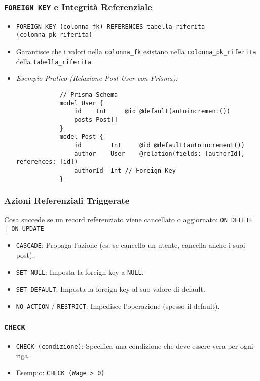 \documentclass{article}
\begin{document}
	\subsubsection{\texttt{FOREIGN KEY} e Integrità Referenziale}
	\begin{itemize}
		\item \texttt{FOREIGN KEY (colonna\_fk) REFERENCES tabella\_riferita (colonna\_pk\_riferita)}
		\item Garantisce che i valori nella \texttt{colonna\_fk} esistano nella \texttt{colonna\_pk\_riferita} della \texttt{tabella\_riferita}.
		\item \textit{Esempio Pratico (Relazione Post-User con Prisma):}
		\begin{verbatim}
			// Prisma Schema
			model User {
				id    Int     @id @default(autoincrement())
				posts Post[]
			}
			model Post {
				id        Int     @id @default(autoincrement())
				author    User    @relation(fields: [authorId], references: [id])
				authorId  Int // Foreign Key
			}
		\end{verbatim}
	\end{itemize}
	\subsubsection{Azioni Referenziali Triggerate}
	Cosa succede se un record referenziato viene cancellato o aggiornato: \texttt{ON DELETE | ON UPDATE}
	\begin{itemize}
		\item \texttt{CASCADE}: Propaga l'azione (es. se cancello un utente, cancella anche i suoi post).
		\item \texttt{SET NULL}: Imposta la foreign key a \texttt{NULL}.
		\item \texttt{SET DEFAULT}: Imposta la foreign key al suo valore di default.
		\item \texttt{NO ACTION} / \texttt{RESTRICT}: Impedisce l'operazione (spesso il default).
	\end{itemize}
	\subsubsection{\texttt{CHECK}}
	\begin{itemize}
		\item \texttt{CHECK (condizione)}: Specifica una condizione che deve essere vera per ogni riga.
		\item Esempio: \texttt{CHECK (Wage > 0)}
	\end{itemize}
	
\end{document}
